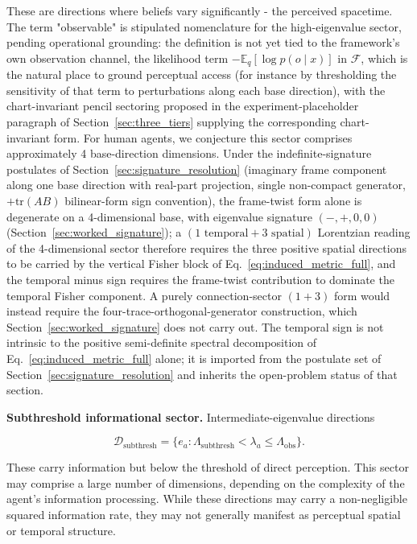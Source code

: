 \documentclass[11pt]{article}
\begin{document}
These are directions where beliefs vary significantly - the perceived spacetime. The term "observable" is stipulated nomenclature for the high-eigenvalue sector, pending operational grounding: the definition is not yet tied to the framework's own observation channel, the likelihood term $-\mathbb{E}_q[\log p(o \mid x)]$ in $\mathcal{F}$, which is the natural place to ground perceptual access (for instance by thresholding the sensitivity of that term to perturbations along each base direction), with the chart-invariant pencil sectoring proposed in the experiment-placeholder paragraph of Section~\ref{sec:three_tiers} supplying the corresponding chart-invariant form. For human agents, we conjecture this sector comprises approximately 4 base-direction dimensions. Under the indefinite-signature postulates of Section~\ref{sec:signature_resolution} (imaginary frame component along one base direction with real-part projection, single non-compact generator, $+\mathrm{tr}(AB)$ bilinear-form sign convention), the frame-twist form alone is degenerate on a 4-dimensional base, with eigenvalue signature $(-,+,0,0)$ (Section~\ref{sec:worked_signature}); a $(1\text{ temporal} + 3\text{ spatial})$ Lorentzian reading of the 4-dimensional sector therefore requires the three positive spatial directions to be carried by the vertical Fisher block of Eq.~\eqref{eq:induced_metric_full}, and the temporal minus sign requires the frame-twist contribution to dominate the temporal Fisher component. A purely connection-sector $(1+3)$ form would instead require the four-trace-orthogonal-generator construction, which Section~\ref{sec:worked_signature} does not carry out. The temporal sign is not intrinsic to the positive semi-definite spectral decomposition of Eq.~\eqref{eq:induced_metric_full} alone; it is imported from the postulate set of Section~\ref{sec:signature_resolution} and inherits the open-problem status of that section.

\textbf{Subthreshold informational sector.} Intermediate-eigenvalue directions

\begin{equation}
\mathcal{D}_{\text{subthresh}} = \{e_a : \Lambda_{\text{subthresh}} < \lambda_a \leq \Lambda_{\text{obs}}\}.
\end{equation}

These carry information but below the threshold of direct perception. This sector may comprise a large number of dimensions, depending on the complexity of the agent's information processing. While these directions may carry a non-negligible squared information rate, they may not generally manifest as perceptual spatial or temporal structure.
\end{document}
